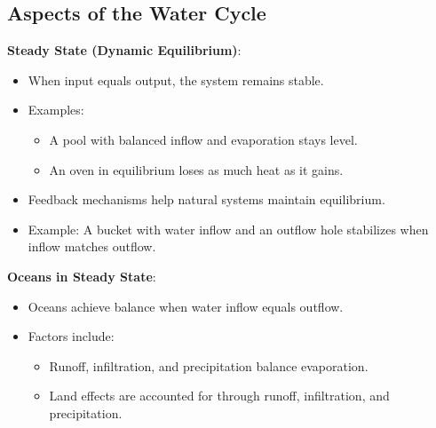 \documentclass[12pt]{article}
\begin{document}
\subsection*{Aspects of the Water Cycle}
\textbf{Steady State (Dynamic Equilibrium)}:
\begin{itemize}
    \item When input equals output, the system remains stable.
    \item Examples:
    \begin{itemize}
        \item A pool with balanced inflow and evaporation stays level.
        \item An oven in equilibrium loses as much heat as it gains.
    \end{itemize}
    \item Feedback mechanisms help natural systems maintain equilibrium.
    \item Example: A bucket with water inflow and an outflow hole stabilizes when inflow matches outflow.
\end{itemize}

\textbf{Oceans in Steady State}:
\begin{itemize}
    \item Oceans achieve balance when water inflow equals outflow.
    \item Factors include:
    \begin{itemize}
        \item Runoff, infiltration, and precipitation balance evaporation.
        \item Land effects are accounted for through runoff, infiltration, and precipitation.
    \end{itemize}
\end{itemize}
\end{document}
